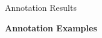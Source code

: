 \documentclass[final,14pt,t]{beamer}
\begin{document}
\begin{frame}{}
\begin{columns}[t]
\begin{column}{.33\linewidth}
\begin{minipage}[t][\textheight]{\linewidth}
\begin{block}{Annotation Results}
\begin{center}
\begin{minipage}{.85\textwidth}

\begin{center}
  \textbf{Annotation Examples}
\end{center}


\end{minipage}
\end{center}
\end{block}
\end{minipage}
\end{column}
\end{columns}
\end{frame}
\end{document}
